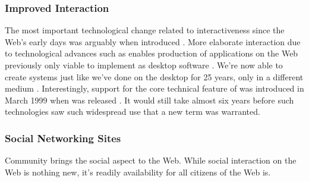 \subsubsection{Improved Interaction}
The most important
technological change related to interactiveness since the Web's early days was
arguably when \citet{garrett05} introduced %
.
More elaborate interaction due to technological advances such as 
enables production of applications on the Web previously only viable to
implement as desktop software .
We're now able to create systems just like we've done on the desktop for 25
years, only in a different medium \citep[p.~64]{arnowitz07}.
Interestingly, support for the core technical feature of  was
introduced in March 1999 when 
was released \citep{microsoft99}. It would still take almost six years before
such technologies saw such widespread use that a new term was warranted.

\subsubsection{Social Networking Sites}
Community brings the social aspect to the Web. While social
interaction on the Web is nothing new, it's readily availability for all
citizens of the Web is.

